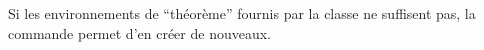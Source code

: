 
Si les environnements de \enquote{théorème} fournis par la classe ne suffisent
pas, la commande  permet d'en créer de nouveaux.

